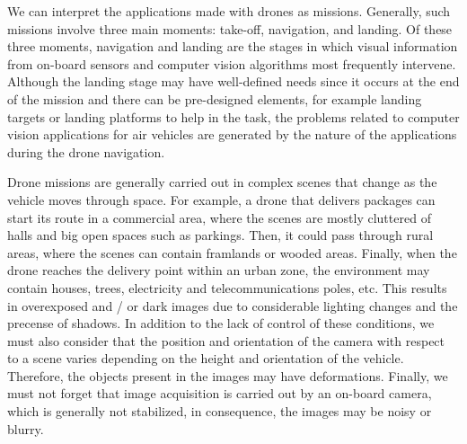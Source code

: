 We can interpret the applications made with drones as missions. Generally, such missions involve three main moments: take-off, navigation, and landing. Of these three moments, navigation and landing are the stages in which visual information from on-board sensors and computer vision algorithms most frequently intervene.
Although the landing stage may have well-defined needs since it occurs at the end of the mission and there can be pre-designed elements, for example landing targets or landing platforms to help in the task, the problems related to computer vision applications for air vehicles are generated by the nature of the applications during the drone navigation. 

Drone missions are generally carried out in complex scenes that change as the vehicle moves through space. For example, a drone that delivers packages can start its route in a commercial area, where the scenes are mostly cluttered of halls and big open spaces such as parkings. Then, it could pass through rural areas, where the scenes can contain framlands or wooded areas. Finally, when the drone reaches the delivery point within an urban zone, the environment may contain houses, trees, electricity and telecommunications poles, etc. This results in overexposed and / or dark images due to considerable lighting changes and the precense of shadows. In addition to the lack of control of these conditions, we must also consider that the position and orientation of the camera with respect to a scene varies depending on the height and orientation of the vehicle. Therefore, the objects present in the images may have deformations. Finally, we must not forget that image acquisition is carried out by an on-board camera, which is generally not stabilized, in consequence, the images may be noisy or blurry.

